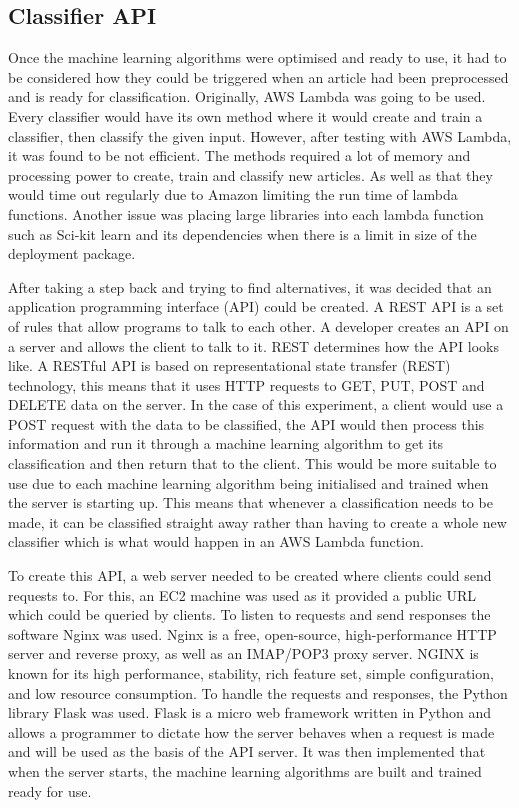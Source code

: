 \documentclass[a4paper,11pt]{report}
\begin{document}
\subsection{Classifier API}
Once the machine learning algorithms were optimised and ready to use, it had to be considered how they could be triggered when an article had been preprocessed and is ready for classification. Originally, AWS Lambda was going to be used.  Every classifier would have its own method where it would create and train a classifier, then classify the given input. However, after testing with AWS Lambda, it was found to be not efficient. The methods required a lot of memory and processing power to create, train and classify new articles. As well as that they would time out regularly due to Amazon limiting the run time of lambda functions. Another issue was placing large libraries into each lambda function such as Sci-kit learn and its dependencies when there is a limit in size of the deployment package.

After taking a step back and trying to find alternatives, it was decided that an application programming interface (API)  could be created.  A REST API is a set of rules that allow programs to talk to each other. A developer creates an API on a server and allows the client to talk to it. REST determines how the API looks like. A RESTful API is based on representational state transfer (REST) technology, this means that it uses  HTTP requests to GET, PUT, POST and DELETE data on the server. In the case of this experiment, a client would use a POST request with the data to be classified, the API would then process this information and run it through a machine learning algorithm to get its classification and then return that to the client.  This would be more suitable to use due to each machine learning algorithm being initialised and trained when the server is starting up. This means that whenever a classification needs to be made, it can be classified straight away rather than having to create a whole new classifier which is what would happen in an AWS Lambda function.

To create this API, a web server needed to be created where clients could send requests to.  For this, an EC2 machine was used as it provided a public URL which could be queried by clients. To listen to requests and send responses the software Nginx was used. Nginx is a free, open-source, high-performance HTTP server and reverse proxy, as well as an IMAP/POP3 proxy server. NGINX is known for its high performance, stability, rich feature set, simple configuration, and low resource consumption. To handle the requests and responses, the Python library Flask was used. Flask is a micro web framework written in Python and allows a programmer  to dictate how the server behaves when a request is made and will be used as the basis of the API server.  It was then implemented that when the server starts, the machine learning algorithms are built and trained ready for use.
\end{document}
